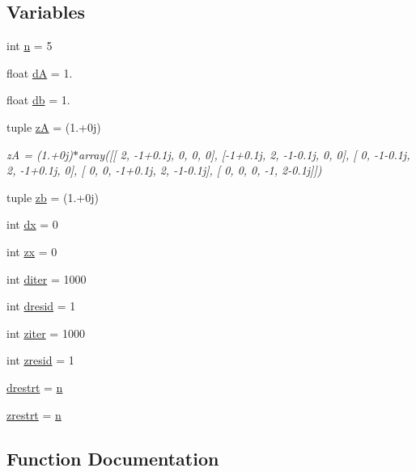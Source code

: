 \subsection*{Variables}
\begin{DoxyCompactItemize}
\item 
int \hyperlink{namespacetest_a9893fd1b53974b0a3c134bd2e50163e6}{n} = 5
\item 
float \hyperlink{namespacetest_a0e3e0685c3885bbd9996e8c97c0718b5}{d\+A} = 1.
\item 
float \hyperlink{namespacetest_a64318c198632d695e0c61b50f9126284}{db} = 1.
\item 
tuple \hyperlink{namespacetest_a59b42baf65b733d63e04bf0b871e98cd}{z\+A} = (1.+0j)
\begin{DoxyCompactList}\small\item\em z\+A = (1.+0j)$\ast$array(\mbox{[}\mbox{[} 2, -\/1+0.1j, 0, 0, 0\mbox{]}, \mbox{[}-\/1+0.1j, 2, -\/1-\/0.\+1j, 0, 0\mbox{]}, \mbox{[} 0, -\/1-\/0.\+1j, 2, -\/1+0.1j, 0\mbox{]}, \mbox{[} 0, 0, -\/1+0.1j, 2, -\/1-\/0.\+1j\mbox{]}, \mbox{[} 0, 0, 0, -\/1, 2-\/0.\+1j\mbox{]}\mbox{]}) \end{DoxyCompactList}\item 
tuple \hyperlink{namespacetest_ae02a6e9ec4e5c8d8ec7f3421d3dc9e68}{zb} = (1.+0j)
\item 
int \hyperlink{namespacetest_a52d96848d24a2f8133653eb707eda14d}{dx} = 0
\item 
int \hyperlink{namespacetest_aefba49a27ed9d351b74e202e6c246fa5}{zx} = 0
\item 
int \hyperlink{namespacetest_a629e2d90d20378b99fc5e08c58a83f3b}{diter} = 1000
\item 
int \hyperlink{namespacetest_aceb99ee5693f47864fccd523dc3e9731}{dresid} = 1
\item 
int \hyperlink{namespacetest_ada01eb8317943098aafde6e4ad69bde7}{ziter} = 1000
\item 
int \hyperlink{namespacetest_ac1f674a9fd2532e0f01b06945f02e25c}{zresid} = 1
\item 
\hyperlink{namespacetest_adc1c3add90e70e3c946bd310792fd48a}{drestrt} = \hyperlink{namespacetest_a9893fd1b53974b0a3c134bd2e50163e6}{n}
\item 
\hyperlink{namespacetest_aecfe76bbc05b795146e283b4766d8051}{zrestrt} = \hyperlink{namespacetest_a9893fd1b53974b0a3c134bd2e50163e6}{n}
\end{DoxyCompactItemize}


\subsection{Function Documentation}
\hypertarget{namespacetest_ad4d6e3be622f358cce39cc22ba1e7bfb}{}
